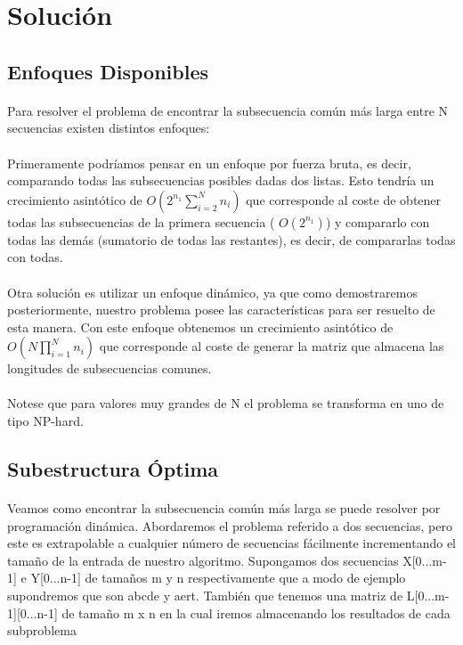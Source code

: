 \documentclass{article}
\begin{document}
\section{Solución}
	\subsection{Enfoques Disponibles}
		\paragraph{}
		Para resolver el problema de encontrar la subsecuencia común más larga entre N secuencias existen distintos enfoques:
		
		\paragraph{}
		 Primeramente podríamos pensar en un enfoque por fuerza bruta, es decir, comparando todas las subsecuencias posibles dadas dos listas. Esto tendría un crecimiento asintótico de $O(2^{n_{1}}\sum_{i = 2}^{N}n_{i})$ que corresponde al coste de obtener todas las subsecuencias de la primera secuencia ( $O(2^{n_{1}})$) y compararlo con todas las demás  (sumatorio de todas las restantes), es decir, de compararlas todas con todas.
		 
		\paragraph{}
		 Otra solución es utilizar un enfoque dinámico, ya que como demostraremos posteriormente, nuestro problema posee las características para ser resuelto de esta manera. Con este enfoque obtenemos un crecimiento asintótico de  $O(N\prod_{i = 1}^{N}n_{i})$ que corresponde al coste de generar la matriz que almacena las longitudes de subsecuencias comunes.

		\paragraph{}
		Notese que para valores muy grandes de N el problema se transforma en uno de tipo NP-hard.
	\subsection{Subestructura Óptima}
		\paragraph{}
		Veamos como encontrar la subsecuencia común más larga se puede resolver por programación dinámica. Abordaremos el problema referido a dos secuencias, pero este es extrapolable a cualquier número de secuencias fácilmente incrementando el tamaño de la entrada de nuestro algoritmo. 
		\newline{}
		Supongamos dos secuencias X[0...m-1] e Y[0...n-1] de tamaños m y n respectivamente que a modo de ejemplo supondremos que son abcde y aert.
		\newline{}
		También que tenemos una matriz de L[0...m-1][0...n-1] de tamaño m x n en la cual iremos almacenando los resultados de cada subproblema
\end{document}

